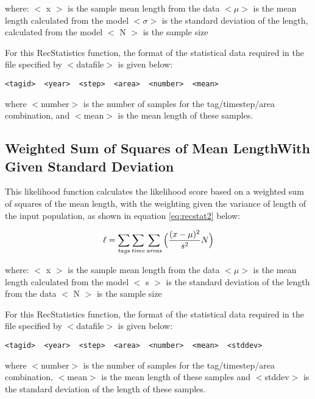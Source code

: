 \documentclass[]{book}
\begin{document}
where: \(<\) x \(>\) is the sample mean length from the data \(<\mu>\) is the
mean length calculated from the model \(<\sigma>\) is the standard
deviation of the length, calculated from the model \(<\) N \(>\) is the
sample size

For this RecStatistics function, the format of the statistical data
required in the file specified by \(<\)datafile\(>\) is given below:

\begin{verbatim}
<tagid>  <year>  <step>  <area>  <number>  <mean>
\end{verbatim}

where \(<\)number\(>\) is the number of samples for the tag/timestep/area
combination, and \(<\)mean\(>\) is the mean length of these samples.

\hypertarget{weighted-sum-of-squares-of-mean-lengthwith-given-standard-deviation-1}{%
\subsection{Weighted Sum of Squares of Mean LengthWith Given Standard Deviation}\label{weighted-sum-of-squares-of-mean-lengthwith-given-standard-deviation-1}}

This likelihood function calculates the likelihood score based on a
weighted sum of squares of the mean length, with the weighting given the
variance of length of the input population, as shown in
equation \eqref{eq:recstat2} below:

\begin{equation}
\label{eq:recstat2}
\ell = \sum_{\it tags}\sum_{\it time}\sum_{\it areas} \Big(\frac{(x-\mu)^2} {s^2} N\Big)\end{equation}

where: \(<\) x \(>\) is the sample mean length from the data \(<\mu>\) is the
mean length calculated from the model \(<\) s \(>\) is the standard
deviation of the length from the data \(<\) N \(>\) is the sample size

For this RecStatistics function, the format of the statistical data
required in the file specified by \(<\)datafile\(>\) is given below:

\begin{verbatim}
<tagid>  <year>  <step>  <area>  <number>  <mean>  <stddev>
\end{verbatim}

where \(<\)number\(>\) is the number of samples for the tag/timestep/area
combination, \(<\)mean\(>\) is the mean length of these samples and
\(<\)stddev\(>\) is the standard deviation of the length of these samples.
\end{document}
